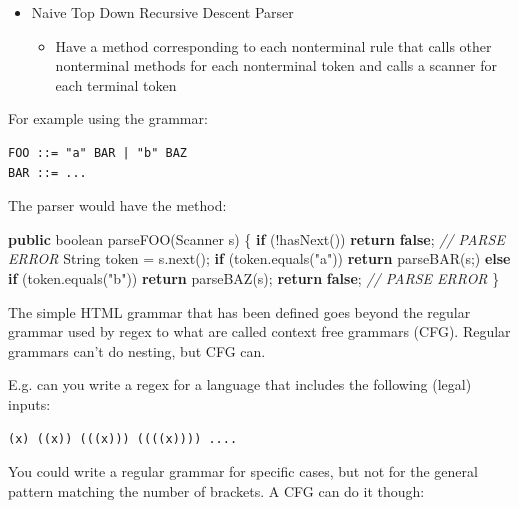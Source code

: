 \documentclass[
]{book}
\newenvironment{Shaded}{\begin{snugshade}}{\end{snugshade}}
\newcommand{\BuiltInTok}[1]{#1}
\newcommand{\CommentTok}[1]{\textcolor[rgb]{0.56,0.35,0.01}{\textit{#1}}}
\newcommand{\DataTypeTok}[1]{\textcolor[rgb]{0.13,0.29,0.53}{#1}}
\newcommand{\FunctionTok}[1]{\textcolor[rgb]{0.00,0.00,0.00}{#1}}
\newcommand{\KeywordTok}[1]{\textcolor[rgb]{0.13,0.29,0.53}{\textbf{#1}}}
\newcommand{\NormalTok}[1]{#1}
\newcommand{\StringTok}[1]{\textcolor[rgb]{0.31,0.60,0.02}{#1}}
\providecommand{\tightlist}{%
  \setlength{\itemsep}{0pt}\setlength{\parskip}{0pt}}
\begin{document}
\begin{itemize}
\tightlist
\item
  Naive Top Down Recursive Descent Parser

  \begin{itemize}
  \tightlist
  \item
    Have a method corresponding to each nonterminal rule that calls other nonterminal methods for each nonterminal token and calls a scanner for each terminal token
  \end{itemize}
\end{itemize}

For example using the grammar:

\begin{verbatim}
FOO ::= "a" BAR | "b" BAZ
BAR ::= ...
\end{verbatim}

The parser would have the method:

\begin{Shaded}
\begin{Highlighting}[]
\KeywordTok{public} \DataTypeTok{boolean} \FunctionTok{parseFOO}\NormalTok{(}\BuiltInTok{Scanner}\NormalTok{ s) \{}
  \KeywordTok{if}\NormalTok{ (!}\FunctionTok{hasNext}\NormalTok{())}
    \KeywordTok{return} \KeywordTok{false}\NormalTok{; }\CommentTok{// PARSE ERROR}
  \BuiltInTok{String}\NormalTok{ token = s.}\FunctionTok{next}\NormalTok{();  }
  \KeywordTok{if}\NormalTok{ (token.}\FunctionTok{equals}\NormalTok{(}\StringTok{"a"}\NormalTok{))}
    \KeywordTok{return} \FunctionTok{parseBAR}\NormalTok{(s;)}
  \KeywordTok{else} \KeywordTok{if}\NormalTok{ (token.}\FunctionTok{equals}\NormalTok{(}\StringTok{"b"}\NormalTok{))}
    \KeywordTok{return} \FunctionTok{parseBAZ}\NormalTok{(s); }
  \KeywordTok{return} \KeywordTok{false}\NormalTok{; }\CommentTok{// PARSE ERROR}
\NormalTok{\}}
\end{Highlighting}
\end{Shaded}

The simple HTML grammar that has been defined goes beyond the regular grammar used by regex to what are called context free grammars (CFG). Regular grammars can't do nesting, but CFG can.

E.g. can you write a regex for a language that includes the following (legal) inputs:

\begin{verbatim}
(x) ((x)) (((x))) ((((x)))) ....
\end{verbatim}

You could write a regular grammar for specific cases, but not for the general pattern matching the number of brackets. A CFG can do it though:
\end{document}
